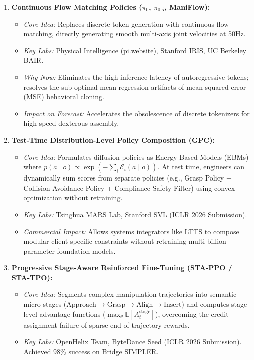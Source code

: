 \documentclass[11pt,a4paper]{article}
\begin{document}
\begin{enumerate}
    \item \textbf{Continuous Flow Matching Policies ($\pi_0$, $\pi_{0.5}$, ManiFlow):}
    \begin{itemize}
        \item \textit{Core Idea:} Replaces discrete token generation with continuous flow matching, directly generating smooth multi-axis joint velocities at 50Hz.
        \item \textit{Key Labs:} Physical Intelligence (pi.website), Stanford IRIS, UC Berkeley BAIR.
        \item \textit{Why Now:} Eliminates the high inference latency of autoregressive tokens; resolves the sub-optimal mean-regression artifacts of mean-squared-error (MSE) behavioral cloning.
        \item \textit{Impact on Forecast:} Accelerates the obsolescence of discrete tokenizers for high-speed dexterous assembly.
    \end{itemize}

    \item \textbf{Test-Time Distribution-Level Policy Composition (GPC):}
    \begin{itemize}
        \item \textit{Core Idea:} Formulates diffusion policies as Energy-Based Models (EBMs) where $p(a \mid o) \propto \exp(-\sum_i \mathcal{E}_i(a \mid o))$. At test time, engineers can dynamically sum scores from separate policies (e.g., Grasp Policy + Collision Avoidance Policy + Compliance Safety Filter) using convex optimization without retraining.
        \item \textit{Key Labs:} Tsinghua MARS Lab, Stanford SVL (ICLR 2026 Submission).
        \item \textit{Commercial Impact:} Allows systems integrators like LTTS to compose modular client-specific constraints without retraining multi-billion-parameter foundation models.
    \end{itemize}

    \item \textbf{Progressive Stage-Aware Reinforced Fine-Tuning (STA-PPO / STA-TPO):}
    \begin{itemize}
        \item \textit{Core Idea:} Segments complex manipulation trajectories into semantic micro-stages ($\text{Approach} \to \text{Grasp} \to \text{Align} \to \text{Insert}$) and computes stage-level advantage functions ($\max_\theta \mathbb{E}[A_t^{\text{stage}}]$), overcoming the credit assignment failure of sparse end-of-trajectory rewards.
        \item \textit{Key Labs:} OpenHelix Team, ByteDance Seed (ICLR 2026 Submission). Achieved 98\% success on Bridge SIMPLER.
    \end{itemize}


\end{enumerate}
\end{document}

